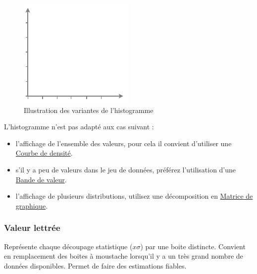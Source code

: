 \documentclass[a4paper,12pt]{article}
\begin{document}
\begin{multicols}{2}
\begin{figure}[H]
\centering
\includegraphics[width=.9\linewidth]{./img/histogram-variantes.pdf}
\caption{\label{fig:Variantes-histogram}Illustration des variantes de l'histogramme}
\end{figure}

L'histogramme n'est pas adapté aux cas suivant :
\begin{itemize}
\item l'affichage de l'ensemble des valeurs, pour cela il convient d'utiliser une \hyperref[sec:org7394e4e]{Courbe de densité}. \autocite{wilkeVisualizingDistributionsHistograms2019}
\item s'il y a peu de valeurs dans le jeu de données, \autocite{weissgerberBarLineGraphs2015} préférez l'utilisation d'une \hyperref[sec:org87e94ee]{Bande de valeur}.
\item l'affichage de plusieurs distributions,\autocite{wilkeVisualizingDistributionsHistograms2019} utilisez une décomposition en \hyperref[sec:org642ccd6]{Matrice de graphique}.
\end{itemize}
\subsubsection*{Valeur lettrée}
\label{sec:org589b065}
Représente chaque découpage statistique (\(x\sigma\)) par une boite distincte. Convient en remplacement des boites à moustache lorsqu'il y a un très grand nombre de données disponibles. Permet de faire des estimations fiables. \autocite{hofmannLettervaluePlotsBoxplots2017,mikeyiHowChooseRight2020}

\end{multicols}
\end{document}
